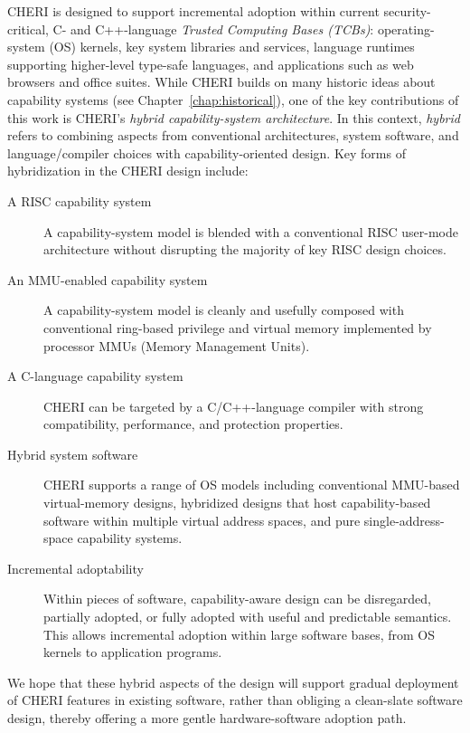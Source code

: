 CHERI is designed to support incremental adoption within current
security-critical, C- and C++-language \textit{Trusted Computing Bases (TCBs)}:
operating-system (OS) kernels, key system libraries and services, language
runtimes supporting higher-level type-safe languages, and applications such as
web browsers and office suites.
While CHERI builds on many historic ideas about capability systems (see
Chapter~\ref{chap:historical}), one of the key contributions of this work is
CHERI's \textit{hybrid capability-system architecture}.
In this context, \textit{hybrid} refers to combining aspects from conventional
architectures, system software, and language/compiler choices with
capability-oriented design.
Key forms of hybridization in the CHERI design include:

\begin{description}
\item[A RISC capability system] A capability-system model is blended with a
  conventional RISC user-mode architecture without disrupting the majority of
  key RISC design choices.

\item[An MMU-enabled capability system] A capability-system model is cleanly
  and usefully composed with conventional ring-based privilege and
  virtual memory implemented by processor MMUs (Memory Management Units).

\item[A C-language capability system] CHERI can be targeted by a
  C/C++-language compiler with strong compatibility, performance, and
  protection properties.

\item[Hybrid system software] CHERI supports a range of OS models including
  conventional MMU-based virtual-memory designs, hybridized designs that
  host capability-based software within multiple virtual address spaces, and
  pure single-address-space capability systems.

\item[Incremental adoptability] Within pieces of software, capability-aware
  design can be disregarded, partially adopted, or fully adopted with useful
  and predictable semantics.
  This allows incremental adoption within large software bases, from OS
  kernels to application programs.
\end{description}

We hope that these hybrid aspects of the design will support gradual
deployment of CHERI features in existing software, rather than obliging a
clean-slate software design, thereby offering a more gentle hardware-software
adoption path.

